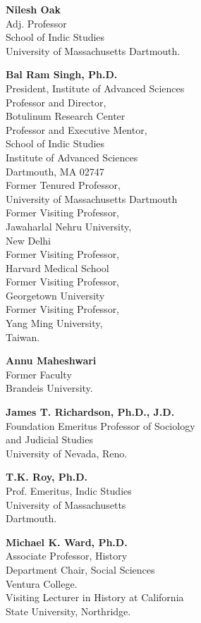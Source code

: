 \textbf{Nilesh Oak}\\ 
Adj. Professor\\
School of Indic Studies\\
University of Massachusetts Dartmouth.
\medskip
 
\textbf{Bal Ram Singh, Ph.D.}\\ 
President, Institute of Advanced Sciences\\[2pt]
Professor and Director,\\ 
Botulinum Research Center\\[2pt]
Professor and Executive Mentor,\\ 
School of Indic Studies\\
Institute of Advanced Sciences\\
Dartmouth, MA 02747\\[2pt]
Former Tenured Professor,\\ 
University of Massachusetts Dartmouth\\[2pt]
Former Visiting Professor,\\ 
Jawaharlal Nehru University,\\ 
New Delhi\\[2pt]
Former Visiting Professor,\\ 
Harvard Medical School\\[2pt]
Former Visiting Professor,\\ 
Georgetown University\\[2pt]
Former Visiting Professor,\\ 
Yang Ming University,\\ 
Taiwan.\\[2pt]
\medskip
 
\textbf{Annu Maheshwari}\\ 
Former Faculty\\
Brandeis University.
\medskip
 
\textbf{James T. Richardson, Ph.D., J.D.}\\ 
Foundation Emeritus Professor of Sociology\\ 
and Judicial Studies\\
University of Nevada, Reno.
\medskip
 
\textbf{T.K. Roy, Ph.D.}\\ 
Prof. Emeritus, Indic Studies\\
University of Massachusetts\\
Dartmouth.
\medskip
 
\textbf{Michael K. Ward, Ph.D.} \\
Associate Professor, History\\
Department Chair, Social Sciences\\
Ventura College.\\[2pt]
Visiting Lecturer in History at California\\
State University, Northridge. 
\medskip

